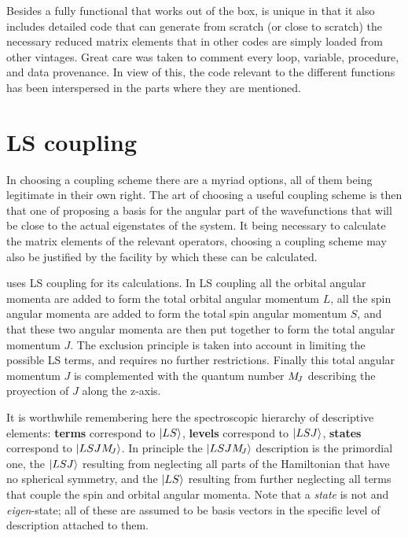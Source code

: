 \documentclass{article}
\begin{document}
Besides a fully functional that works out of the box, \qlanth is unique in that it also includes detailed code that can generate from scratch (or close to scratch) the necessary reduced matrix elements that in other codes are simply loaded from other vintages. Great care was taken to comment every loop, variable, procedure, and data provenance. In view of this, the code relevant to the different functions has been interspersed in the parts where they are mentioned.

\vspace*{\fill}

\newpage

\section{LS coupling}

In choosing a coupling scheme there are a myriad options, all of them being legitimate in their own right. The art of choosing a useful coupling scheme is then that one of proposing a basis for the angular part of the wavefunctions that will be close to the actual eigenstates of the system. It being necessary to calculate the matrix elements of the relevant operators, choosing a coupling scheme may also be justified by the facility by which these can be calculated.

\qlanth uses LS coupling for its calculations. In LS coupling all the orbital angular momenta are added to form the total orbital angular momentum $L$, all the spin angular momenta are added to form the total spin angular momentum $S$, and that these two angular momenta are then put together to form the total angular momentum $J$. The exclusion principle is taken into account in limiting the possible LS terms, and requires no further restrictions. Finally this total angular momentum $J$ is complemented with the quantum number $M_{\!{J}}$ describing the proyection of $J$ along the z-axis.

It is worthwhile remembering here the spectroscopic hierarchy of descriptive elements: \textbf{terms} correspond to $|LS\rangle$, \textbf{levels} correspond to $|LSJ\rangle$, \textbf{states} correspond to $|LSJM_{\!{J}}\rangle$. In principle the  $|LSJM_{\!{J}}\rangle$ description is the primordial one, the $|LSJ\rangle$ resulting from neglecting all parts of the Hamiltonian that have no spherical symmetry, and the $|LS\rangle$ resulting from further neglecting all terms that couple the spin and orbital angular momenta. Note that a \textit{state} is not and \textit{eigen}-state; all of these are assumed to be basis vectors in the specific level of description attached to them.
\end{document}

